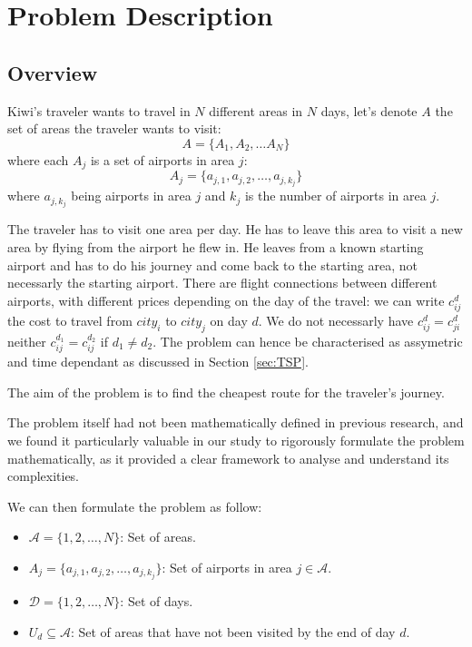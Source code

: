 \chapter{Problem Description}
\label{Chapter3}

\section{Overview}

Kiwi's traveler wants to travel in $N$ different areas in $N$ days, let's denote $A$ the set of areas the traveler wants to visit: \[A=\{A_{1}, A_{2}, \ldots A_{{N}}\}\]
where each \(A_{j}\) is a set of airports in area \(j\):
\[
    A_{j} = \{ a_{j,1}, a_{j,2}, \ldots, a_{j,k_j} \}
\]
where \( a_{j,k_j} \) being airports in area \(j\) and \(k_j\) is the number of airports in area \(j\).

The traveler has to visit one area per day. He has to leave this area to visit a new area by flying from the airport he flew in.
He leaves from a known starting airport and has to do his journey and come back to the starting area, not necessarly the starting airport.
There are flight connections between different airports, with different prices depending on the day of the travel:
we can write $c^{d}_{ij}$ the cost to travel from $city_i$ to $city_j$ on day $d$. We do not necessarly have $c^{d}_{ij}=c^{d}_{ji}$ neither $c^{d_1}_{ij}=c^{d_2}_{ij}$ if $d_1 \neq d_2$. The problem can hence be characterised as assymetric and time dependant as discussed in Section \ref{sec:TSP}.

The aim of the problem is to find the cheapest route for the traveler's journey.

The problem itself had not been mathematically defined in previous research, and we found it particularly valuable in our study to rigorously formulate the problem mathematically, as it provided a clear framework to analyse and understand its complexities.

We can then formulate the problem as follow:

\begin{itemize}
    \item $\mathcal{A} = \{1, 2, \ldots, N\}$: Set of areas.
    \item $A_j = \{a_{j,1}, a_{j,2}, \ldots, a_{j,k_j}\}$: Set of airports in area $j \in \mathcal{A}$.
    \item $\mathcal{D} = \{1, 2, \ldots, N\}$: Set of days.
    \item $U_d \subseteq \mathcal{A}$: Set of areas that have not been visited by the end of day $d$.
\end{itemize}

